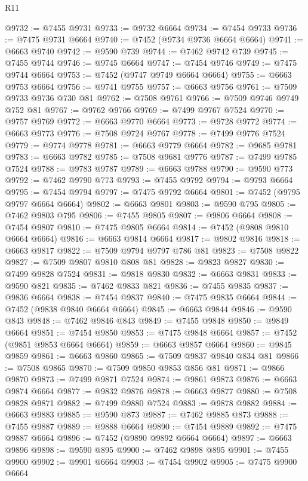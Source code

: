 \begin{lexlean}{R11}
\begin{coremodule}
@9732 := @7455 @9731
@9733 := @9732 @6664
@9734 := @7454 @9733
@9736 := @7475 @9731 @6664
@9740 := @7452 (@9734 @9736 @6664 @6664)
@9741 := @6663 @9740
@9742 := @9590 @739
@9744 := @7462 @9742 @739
@9745 := @7455 @9744
@9746 := @9745 @6664
@9747 := @7454 @9746
@9749 := @7475 @9744 @6664
@9753 := @7452 (@9747 @9749 @6664 @6664)
@9755 := @6663 @9753 @6664
@9756 := @9741 @9755
@9757 := @6663 @9756
@9761 := @7509 @9733 @9736 @730 @81
@9762 := @7508 @9761
@9766 := @7509 @9746 @9749 @752 @81
@9767 := @9762 @9766
@9769 := @7499 @9767 @7524
@9770 := @9757 @9769
@9772 := @6663 @9770 @6664
@9773 := @9728 @9772
@9774 := @6663 @9773
@9776 := @7508 @9724 @9767
@9778 := @7499 @9776 @7524
@9779 := @9774 @9778
@9781 := @6663 @9779 @6664
@9782 := @9685 @9781
@9783 := @6663 @9782
@9785 := @7508 @9681 @9776
@9787 := @7499 @9785 @7524
@9788 := @9783 @9787
@9789 := @6663 @9788
@9790 := @9590 @773
@9792 := @7462 @9790 @773
@9793 := @7455 @9792
@9794 := @9793 @6664
@9795 := @7454 @9794
@9797 := @7475 @9792 @6664
@9801 := @7452 (@9795 @9797 @6664 @6664)
@9802 := @6663 @9801
@9803 := @9590 @795
@9805 := @7462 @9803 @795
@9806 := @7455 @9805
@9807 := @9806 @6664
@9808 := @7454 @9807
@9810 := @7475 @9805 @6664
@9814 := @7452 (@9808 @9810 @6664 @6664)
@9816 := @6663 @9814 @6664
@9817 := @9802 @9816
@9818 := @6663 @9817
@9822 := @7509 @9794 @9797 @786 @81
@9823 := @7508 @9822
@9827 := @7509 @9807 @9810 @808 @81
@9828 := @9823 @9827
@9830 := @7499 @9828 @7524
@9831 := @9818 @9830
@9832 := @6663 @9831
@9833 := @9590 @821
@9835 := @7462 @9833 @821
@9836 := @7455 @9835
@9837 := @9836 @6664
@9838 := @7454 @9837
@9840 := @7475 @9835 @6664
@9844 := @7452 (@9838 @9840 @6664 @6664)
@9845 := @6663 @9844
@9846 := @9590 @843
@9848 := @7462 @9846 @843
@9849 := @7455 @9848
@9850 := @9849 @6664
@9851 := @7454 @9850
@9853 := @7475 @9848 @6664
@9857 := @7452 (@9851 @9853 @6664 @6664)
@9859 := @6663 @9857 @6664
@9860 := @9845 @9859
@9861 := @6663 @9860
@9865 := @7509 @9837 @9840 @834 @81
@9866 := @7508 @9865
@9870 := @7509 @9850 @9853 @856 @81
@9871 := @9866 @9870
@9873 := @7499 @9871 @7524
@9874 := @9861 @9873
@9876 := @6663 @9874 @6664
@9877 := @9832 @9876
@9878 := @6663 @9877
@9880 := @7508 @9828 @9871
@9882 := @7499 @9880 @7524
@9883 := @9878 @9882
@9884 := @6663 @9883
@9885 := @9590 @873
@9887 := @7462 @9885 @873
@9888 := @7455 @9887
@9889 := @9888 @6664
@9890 := @7454 @9889
@9892 := @7475 @9887 @6664
@9896 := @7452 (@9890 @9892 @6664 @6664)
@9897 := @6663 @9896
@9898 := @9590 @895
@9900 := @7462 @9898 @895
@9901 := @7455 @9900
@9902 := @9901 @6664
@9903 := @7454 @9902
@9905 := @7475 @9900 @6664

\end{coremodule}
\end{lexlean}

